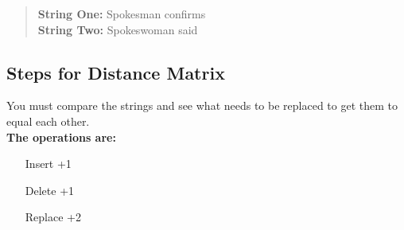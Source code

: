 
\begin{quote}
\textbf{String One: } Spokesman confirms \\
\textbf{String Two: } Spokeswoman said
\end{quote}

\subsection{Steps for Distance Matrix}
You must compare the strings and see what needs to be replaced to get them to equal each other. \\
\textbf{The operations are: }
\begin{itemize}
  \item [Insert] +1
  \item [Delete] +1
  \item [Replace] +2
\end{itemize}
